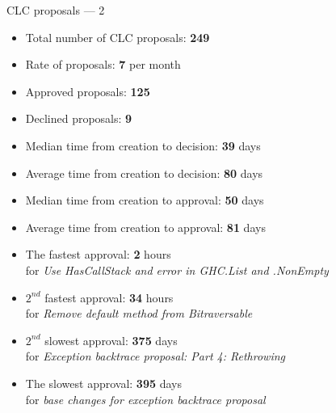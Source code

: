 \documentclass[handout]{beamer}
\begin{document}
\begin{frame}{CLC proposals --- 2}

\begin{itemize}[<+->]

\def\tt{}

\item Total number of CLC proposals: {\bf 249}
\item Rate of proposals: {\bf 7} per month
\item Approved proposals: {\bf 125}
\item Declined proposals: {\bf 9}



\medskip

\item Median  time from creation to decision: {\bf 39} days
\item Average time from creation to decision: {\bf 80} days
\item Median  time from creation to approval: {\bf 50} days
\item Average time from creation to approval: {\bf 81} days


\medskip

\item The fastest approval:
  {\bf 2} hours \\ {\small for {\it Use {\tt HasCallStack} and {\tt error} in {\tt GHC.List} and {\tt .NonEmpty}}}
\item $2^{nd}$ fastest approval:
  {\bf 34} hours \\ {\small for {\it Remove default method from {\tt Bitraversable}}}
\item $2^{nd}$ slowest approval:
  {\bf 375} days \\ {\small for {\it Exception backtrace proposal: Part 4: Rethrowing}}
\item The slowest approval:
  {\bf 395} days \\ {\small for {\it {\tt base} changes for exception backtrace proposal}}


\end{itemize}
\end{frame}
\end{document}
